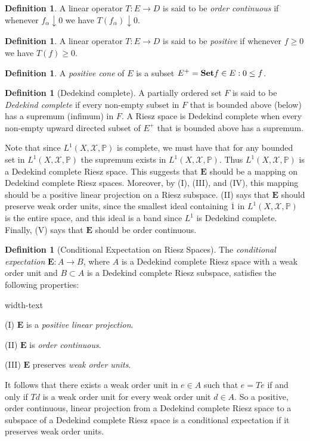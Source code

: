 \documentclass[letterpaper,10pt,oneside,onecolumn,reqno]{amsart}
\renewcommand{\P}{\mathbb P}
\newcommand{\X}{\mathcal X}
\theoremstyle{definition}
\newtheorem{defn}[thm]{Definition}
\newcommand{\catname}[1]{{\normalfont\textbf{#1}}}
\newcommand{\Set}{\catname{Set}}
\renewcommand{\bar}[1]{\overline{#1}}
\begin{document}
\begin{defn}\label{def:14}
A linear operator $T : E \to D$ is said to be \emph{order continuous} if whenever $f_{\alpha} \downarrow 0$ we have $T(f_{\alpha}) \downarrow 0$.
\end{defn}
\begin{defn}\label{def:15}
A linear operator $T : E \to D$ is said to be \emph{positive} if whenever $f \geq 0$ we have $T(f) \geq 0$.
\end{defn}

\begin{defn}\label{def:16}
A \emph{positive cone} of $E$ is a subset $E^+ = \Set{f \in E : 0 \leq f}$.
\end{defn}


\begin{defn}[Dedekind complete]\label{def:17}
A partially ordered set $F$ is said to be \emph{Dedekind complete} if every non-empty subset in $F$ that is bounded above (below) has a supremum (infimum) in $F$. A Riesz space is Dedekind complete when every non-empty upward directed subset of $E^+$ that is bounded above has a supremum.
\end{defn}


Note that since $L^1(X,\X,\P)$ is complete, we must have that for any bounded set in $L^1(X,\X,\P)$ the supremum exists in $L^1(X,\X,\P)$. Thus $L^1(X,\X,\P)$ is a Dedekind complete Riesz space. This suggests that $\mathbf{E}$ should be a mapping on Dedekind complete Riesz spaces. Moreover, by (I), (III), and (IV), this mapping should be a positive linear projection on a Riesz subspace. (II) says that $\mathbf{E}$ should preserve weak order units, since the smallest ideal containing $\bar{1}$ in $L^1(X,\X,\P)$ is the entire space, and this ideal is a band since $L^1$ is Dedekind complete. Finally, (V) says that $\mathbf{E}$ should be order continuous. 

\begin{defn}[Conditional Expectation on Riesz Spaces]\label{def:18}
The \emph{conditional expectation} $\mathbf{E}: A \to B$, where $A$ is a Dedekind complete Riesz space with a weak order unit and $B \subset A$ is a Dedekind complete Riesz subspace, satisfies the following properties:

\begin{deflist}{width-text}
\item[(I)] $\mathbf{E}$ is a \emph{positive linear projection}.
\item[(II)] $\mathbf{E}$ is \emph{order continuous}.
\item[(III)] $\mathbf{E}$ preserves \emph{weak order units}.
\end{deflist}

It follows that there exists a weak order unit in $e \in A$ such that $e = Te$ if and only if $Td$ is a weak order unit for every weak order unit $d \in A$. So a positive, order continuous, linear projection from a Dedekind complete Riesz space to a subspace of a Dedekind complete Riesz space is a conditional expectation if it preserves weak order units.
\end{defn}
\end{document}
